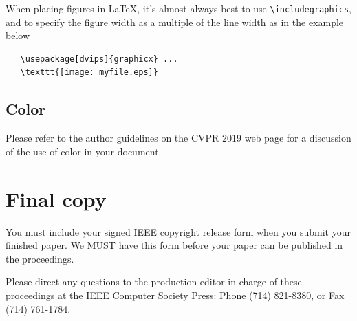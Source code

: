 \documentclass[10pt,twocolumn,letterpaper]{article}
\begin{document}
When placing figures in \LaTeX, it's almost always best to use
\verb+\includegraphics+, and to specify the  figure width as a multiple of
the line width as in the example below
{\small\begin{verbatim}
   \usepackage[dvips]{graphicx} ...
   \texttt{[image: myfile.eps]}
\end{verbatim}
}


\subsection{Color}

Please refer to the author guidelines on the CVPR 2019 web page for a discussion
of the use of color in your document.

\section{Final copy}

You must include your signed IEEE copyright release form when you submit
your finished paper. We MUST have this form before your paper can be
published in the proceedings.

Please direct any questions to the production editor in charge of these
proceedings at the IEEE Computer Society Press: Phone (714) 821-8380, or
Fax (714) 761-1784.

{\small


}
\end{document}
